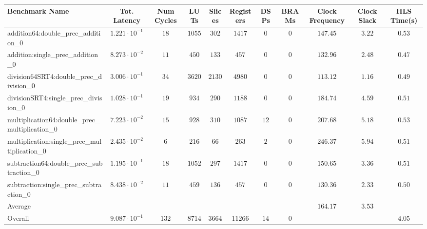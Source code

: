 \begin{tabular}{|l|c|c|c|c|c|c|c|c|c|c|}
\hline
Benchmark Name                                   & Tot. Latency            & Num Cycles & LUTs     & Slices   & Registers & DSPs   & BRAMs & Clock Frequency & Clock Slack & HLS Time(s) \\
\hline
addition64:double\_prec\_addition\_0             & $ 1.221 \cdot 10^{-1} $ & $ 18     $ & $ 1055 $ & $ 302  $ & $ 1417  $ & $ 0  $ & $ 0 $ & $ 147.45      $ & $ 3.22    $ & $ 0.53    $ \\
addition:single\_prec\_addition\_0               & $ 8.273 \cdot 10^{-2} $ & $ 11     $ & $ 450  $ & $ 133  $ & $ 457   $ & $ 0  $ & $ 0 $ & $ 132.96      $ & $ 2.48    $ & $ 0.47    $ \\
division64SRT4:double\_prec\_division\_0         & $ 3.006 \cdot 10^{-1} $ & $ 34     $ & $ 3620 $ & $ 2130 $ & $ 4980  $ & $ 0  $ & $ 0 $ & $ 113.12      $ & $ 1.16    $ & $ 0.49    $ \\
divisionSRT4:single\_prec\_division\_0           & $ 1.028 \cdot 10^{-1} $ & $ 19     $ & $ 934  $ & $ 290  $ & $ 1188  $ & $ 0  $ & $ 0 $ & $ 184.74      $ & $ 4.59    $ & $ 0.51    $ \\
multiplication64:double\_prec\_multiplication\_0 & $ 7.223 \cdot 10^{-2} $ & $ 15     $ & $ 928  $ & $ 310  $ & $ 1087  $ & $ 12 $ & $ 0 $ & $ 207.68      $ & $ 5.18    $ & $ 0.53    $ \\
multiplication:single\_prec\_multiplication\_0   & $ 2.435 \cdot 10^{-2} $ & $ 6      $ & $ 216  $ & $ 66   $ & $ 263   $ & $ 2  $ & $ 0 $ & $ 246.37      $ & $ 5.94    $ & $ 0.51    $ \\
subtraction64:double\_prec\_subtraction\_0       & $ 1.195 \cdot 10^{-1} $ & $ 18     $ & $ 1052 $ & $ 297  $ & $ 1417  $ & $ 0  $ & $ 0 $ & $ 150.65      $ & $ 3.36    $ & $ 0.51    $ \\
subtraction:single\_prec\_subtraction\_0         & $ 8.438 \cdot 10^{-2} $ & $ 11     $ & $ 459  $ & $ 136  $ & $ 457   $ & $ 0  $ & $ 0 $ & $ 130.36      $ & $ 2.33    $ & $ 0.50    $ \\
\hline
Average                                          & $                     $ & $        $ & $      $ & $      $ & $       $ & $    $ & $   $ & $ 164.17      $ & $ 3.53    $ & $         $ \\
\hline
Overall                                          & $ 9.087 \cdot 10^{-1} $ & $ 132    $ & $ 8714 $ & $ 3664 $ & $ 11266 $ & $ 14 $ & $ 0 $ & $             $ & $         $ & $ 4.05    $ \\
\hline
\end{tabular}
